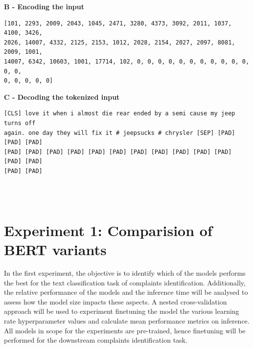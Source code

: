 \textbf{B - Encoding the input}\newline

\begin{adjustbox}{minipage={\textwidth},fbox}
    \begin{verbatim}[101, 2293, 2009, 2043, 1045, 2471, 3280, 4373, 3092, 2011, 1037, 4100, 3426, 
2026, 14007, 4332, 2125, 2153, 1012, 2028, 2154, 2027, 2097, 8081, 2009, 1001, 
14007, 6342, 10603, 1001, 17714, 102, 0, 0, 0, 0, 0, 0, 0, 0, 0, 0, 0, 0, 0, 
0, 0, 0, 0, 0]\end{verbatim}
\end{adjustbox} \newline\newline

\textbf{C - Decoding the tokenized input}\newline

\begin{adjustbox}{minipage={\textwidth},fbox}
    \begin{verbatim}[CLS] love it when i almost die rear ended by a semi cause my jeep turns off 
again. one day they will fix it # jeepsucks # chrysler [SEP] [PAD] [PAD] [PAD] 
[PAD] [PAD] [PAD] [PAD] [PAD] [PAD] [PAD] [PAD] [PAD] [PAD] [PAD] [PAD] [PAD] 
[PAD] [PAD]\end{verbatim}
\end{adjustbox}\\ \\

\section{Experiment 1: Comparision of BERT variants}
In the first experiment, the objective is to identify which of the models performs the best for the text classification task of complaints identification. Additionally, the relative performance of the models and the inference time will be analysed to assess how the model size impacts these aspects. A nested cross-validation approach will be used to experiment finetuning the model the various learning rate hyperparameter values and calculate mean performance metrics on inference. All models in scope for the experiments are pre-trained, hence finetuning will be performed for the downstream complaints identification task.\\

